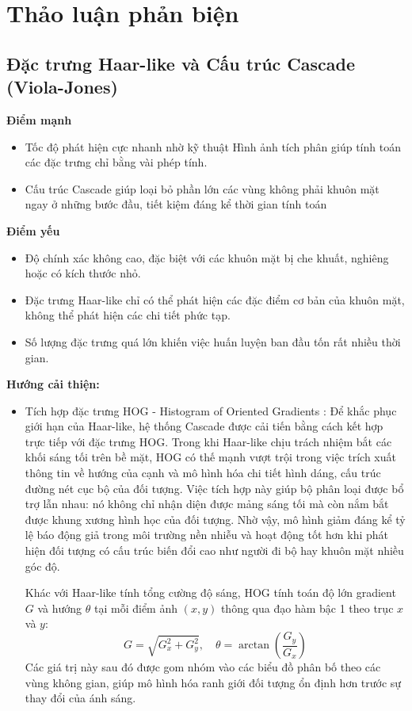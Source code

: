 \section{Thảo luận phản biện}
\subsection{Đặc trưng Haar-like và Cấu trúc Cascade (Viola-Jones)}
\textbf{Điểm mạnh}
\begin{itemize}
    \item Tốc độ phát hiện cực nhanh nhờ kỹ thuật Hình ảnh tích phân giúp tính toán các đặc trưng chỉ bằng vài phép tính.
    \item Cấu trúc Cascade giúp loại bỏ phần lớn các vùng không phải khuôn mặt ngay ở những bước đầu, tiết kiệm đáng kể thời gian tính toán
\end{itemize}
\textbf{Điểm yếu}
\begin{itemize}
    \item Độ chính xác không cao, đặc biệt với các khuôn mặt bị che khuất, nghiêng hoặc có kích thước nhỏ.
    \item Đặc trưng Haar-like chỉ có thể phát hiện các đặc điểm cơ bản của khuôn mặt, không thể phát hiện các chi tiết phức tạp.
    \item Số lượng đặc trưng quá lớn khiến việc huấn luyện ban đầu tốn rất nhiều thời gian.
\end{itemize}
\textbf{Hướng cải thiện:}
\begin{itemize}
    \item Tích hợp đặc trưng HOG - Histogram of Oriented Gradients \cite{dalal2005histograms}: Để khắc phục giới hạn của Haar-like, hệ thống Cascade được cải tiến bằng cách kết hợp trực tiếp với đặc trưng HOG. Trong khi Haar-like chịu trách nhiệm bắt các khối sáng tối trên bề mặt, HOG có thế mạnh vượt trội trong việc trích xuất thông tin về hướng của cạnh và mô hình hóa chi tiết hình dáng, cấu trúc đường nét cục bộ của đối tượng. Việc tích hợp này giúp bộ phân loại được bổ trợ lẫn nhau: nó không chỉ nhận diện được mảng sáng tối mà còn nắm bắt được khung xương hình học của đối tượng. Nhờ vậy, mô hình giảm đáng kể tỷ lệ báo động giả trong môi trường nền nhiễu và hoạt động tốt hơn khi phát hiện đối tượng có cấu trúc biến đổi cao như người đi bộ hay khuôn mặt nhiều góc độ.
    
    Khác với Haar-like tính tổng cường độ sáng, HOG tính toán độ lớn gradient $G$ và hướng $\theta$ tại mỗi điểm ảnh $(x,y)$ thông qua đạo hàm bậc 1 theo trục $x$ và $y$:
    \begin{equation}
        G = \sqrt{G_x^2 + G_y^2}, \quad \theta = \arctan\left(\frac{G_y}{G_x}\right)
    \end{equation}
    Các giá trị này sau đó được gom nhóm vào các biểu đồ phân bố theo các vùng không gian, giúp mô hình hóa ranh giới đối tượng ổn định hơn trước sự thay đổi của ánh sáng.
\end{itemize}

